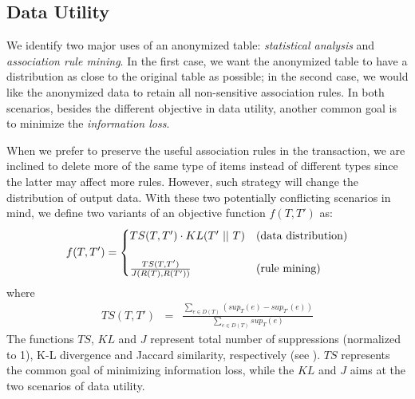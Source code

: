\subsection{Data Utility}
\label{sec:du}
We identify two major uses of an anonymized table:
{\em statistical analysis} and {\em association rule mining}.
In the first case, we want the anonymized table to have a distribution
as close to the original table as possible;
in the second case,
we would like the anonymized data to retain all non-sensitive association rules. In both scenarios, besides the different objective in data utility, another common goal is to minimize the {\em information loss}. 
 
When we prefer to preserve the useful association rules in the transaction,
we are inclined to delete more of the same type of items instead of 
different types since the latter may affect more rules. 
However, such strategy will
change the distribution of output data. 
With these two potentially conflicting scenarios in mind, 
we define two variants of an objective function $f(T, T')$ as:
\begin{equation}
f(T, T') =
\begin{cases}
TS(T, T')\cdot KL(T'~||~T) & \rm{(data~ distribution)} \\
& \\
\frac{TS(T, T')}{J(R(T), R(T'))} & \rm{(rule~ mining)}
\end{cases}
\end{equation}
where
\begin{eqnarray}
TS(T,T') &=& \frac{\sum_{e\in D(T)}(sup_T(e) - sup_{T'}(e))}{\sum_{e\in D(T)}sup_{T}(e)} %
\end{eqnarray}
The functions $TS$, $KL$ and $J$ represent
total number of suppressions (normalized to 1),
K-L divergence\cite{kl-divergence} and
Jaccard similarity\cite{jaccard-sim}, respectively 
(see ). $TS$ represents the common goal of
minimizing information loss, while the $KL$ and $J$ aims at the 
two scenarios of data utility.

